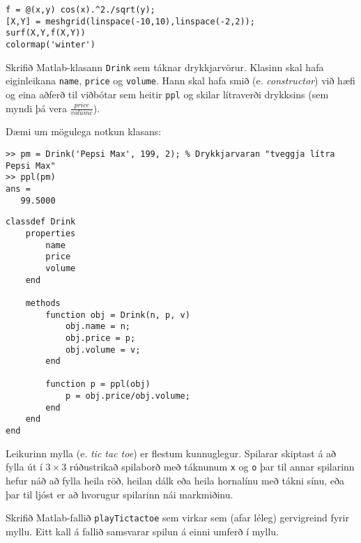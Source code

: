 \documentclass[addpoints]{exam}
\begin{document}
\begin{questions}
\begin{solution}
\begin{verbatim}
f = @(x,y) cos(x).^2./sqrt(y);
[X,Y] = meshgrid(linspace(-10,10),linspace(-2,2));
surf(X,Y,f(X,Y))
colormap('winter')
\end{verbatim}

\end{solution}

\newpage

\question[10] Skrifið Matlab-klasann \texttt{Drink} sem táknar drykkjarvörur. Klasinn skal hafa eiginleikana \texttt{name}, \texttt{price} og \texttt{volume}. Hann skal hafa smið (e. \emph{constructor}) við hæfi og eina aðferð til viðbótar sem heitir \texttt{ppl} og skilar lítraverði drykksins (sem myndi þá vera $\frac{price}{volume}$).

Dæmi um mögulega notkun klasans:

\begin{verbatim}
>> pm = Drink('Pepsi Max', 199, 2); % Drykkjarvaran "tveggja lítra Pepsi Max"
>> ppl(pm)
ans =
   99.5000
\end{verbatim}

\begin{solution}
\begin{verbatim}
classdef Drink
    properties
        name
        price
        volume
    end
    
    methods
        function obj = Drink(n, p, v)
            obj.name = n;
            obj.price = p;
            obj.volume = v;
        end
        
        function p = ppl(obj)
            p = obj.price/obj.volume;
        end
    end
end
\end{verbatim}

\end{solution}


\newpage

\question[10] Leikurinn mylla (e. \emph{tic tac toe}) er flestum kunnuglegur. Spilarar skiptast á að fylla út í $3 \times 3$ rúðustrikað spilaborð með táknunum \texttt{x} og \texttt{o} þar til annar spilarinn hefur náð að fylla heila röð, heilan dálk eða heila hornalínu með tákni sínu, eða þar til ljóst er að hvorugur spilarinn nái markmiðinu. %

Skrifið Matlab-fallið \texttt{playTictactoe} sem virkar sem (afar léleg) gervigreind fyrir myllu. Eitt kall á fallið samsvarar spilun á einni umferð í myllu.


\end{questions}
\end{document}
